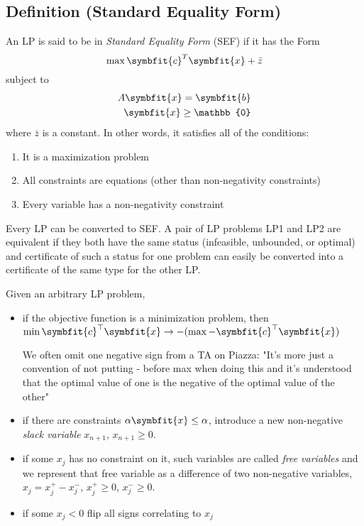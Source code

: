 \begin{defbox}
    \subsection{Definition (Standard Equality Form)}
    An LP is said to be in \emph{Standard Equality Form} (SEF) if it has the Form
    \[ \max \symbfit{c}^T \symbfit{x}+\bar{z}\]
    subject to
    \begin{align*}
        A \symbfit{x}=\symbfit{b}\\
        \symbfit{x}\ge \mathbb{0}
    \end{align*}
    where $ \bar{z} $ is a constant.
    In other words, it satisfies all of the conditions:
    \begin{enumerate}[(1)]
        \item It is a maximization problem
        \item All constraints are equations (other than non-negativity
        constraints)
        \item Every variable has a non-negativity constraint
    \end{enumerate}
\end{defbox}
Every LP can be converted to SEF. A pair of LP problems LP1 and LP2 are equivalent if they both have the
same status (infeasible, unbounded, or optimal) and certificate of such a status for one problem can easily
be converted into a certificate of the same type for the other LP.

Given an arbitrary LP problem, 
\begin{itemize}
    \item if the objective function is a minimization problem, then 
    $\min \symbfit{c}^\top \symbfit{x}\rightarrow -(\max -\symbfit{c}^\top \symbfit{x})$
        \begin{remark}
        We often omit one negative sign
        from a TA on Piazza: "It's more just a convention of not putting - 
        before max when doing this and it's understood that the 
        optimal value of one is the negative of the optimal value of the other"
        \end{remark} 
    \item if there are constraints $\alpha\symbfit{x}\le \alpha$, introduce a new
    non-negative \emph{slack variable} $x_{n+1}$, $x_{n+1}\ge 0$.
    \item if some $x_j$ has no constraint on it, such variables are called \emph{free variables} and
    we represent that free variable as a difference of two non-negative variables,
    $x_j=x_j^+-x_j^-$, $x_j^+\ge 0$, $x_j^-\ge 0$.
    \item if some $x_j<0$ flip all signs correlating to $x_j$
\end{itemize}

